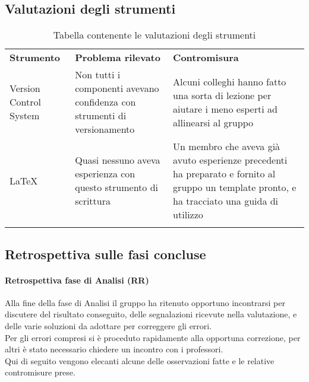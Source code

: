 \documentclass[../piano_di_qualifica.tex]{subfiles}
\begin{document}
\subsection{Valutazioni degli strumenti}
\label{sub:valut_strumenti}

\begin{center}
	\begin{longtable}{|p{3cm}|p{4.5cm}|p{4.5cm}|}
		\hline
		\rowcolor{lightgray}
		\textbf{Strumento}                                                       & \textbf{Problema rilevato} & \textbf{Contromisura}                 \\
		Version Control System                                                   &
		Non tutti i componenti avevano confidenza con strumenti di versionamento &
		Alcuni colleghi hanno fatto una sorta di lezione per aiutare i meno esperti ad allinearsi al gruppo                                           \\
		\LaTeX                                                                   &
		Quasi nessuno aveva esperienza con questo strumento di scrittura         &
		Un membro che aveva già avuto esperienze precedenti ha preparato e fornito al gruppo un template pronto, e ha tracciato una guida di utilizzo \\
		\hline
		\rowcolor{white}
		\caption{Tabella contenente le valutazioni degli strumenti}
	\end{longtable}
\end{center}

\subsection{Retrospettiva sulle fasi concluse}
\label{sub:retrospettiva}

\paragraph{Retrospettiva fase di Analisi (RR)}
\label{par:retrospettiva-RR}
Alla fine della fase di Analisi il gruppo ha ritenuto opportuno incontrarsi per discutere del risultato conseguito, delle segnalazioni
ricevute nella valutazione, e delle varie soluzioni da adottare per correggere gli errori.\\
Per gli errori compresi si è proceduto rapidamente alla opportuna correzione, per altri è stato necessario chiedere un incontro
con i professori. \\
Qui di seguito vengono elecanti alcune delle osservazioni fatte e le relative contromisure prese.\\
\end{document}
